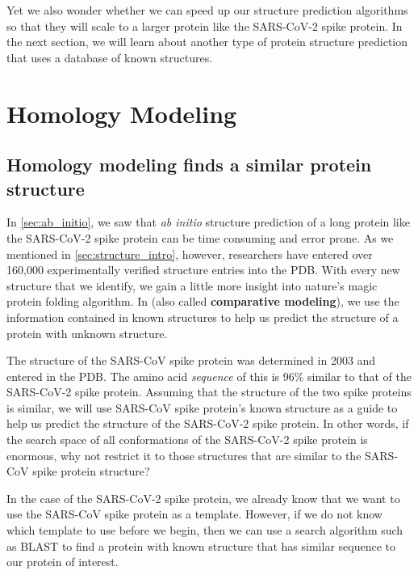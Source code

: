 Yet we also wonder whether we can speed up our structure prediction algorithms so that they will scale to a larger protein like the SARS-CoV-2 spike protein. In the next section, we will learn about another type of protein structure prediction that uses a database of known structures.\\

\begin{qbox}\end{qbox}

\FloatBarrier
{}

\section{Homology Modeling}
\label{sec:homology}
\subsection{Homology modeling finds a similar protein structure}

In \autoref{sec:ab_initio}, we saw that \textit{ab initio} structure prediction of a long protein like the SARS-CoV-2 spike protein can be time consuming and error prone. As we mentioned in \autoref{sec:structure_intro}, however, researchers have entered over 160,000 experimentally verified structure entries into the PDB. With every new structure that we identify, we gain a little more insight into nature's magic protein folding algorithm. In  (also called \textbf{comparative modeling}), we use the information contained in known structures to help us predict the structure of a protein with unknown structure.

The structure of the SARS-CoV spike protein was determined in 2003 and entered in the PDB. The amino acid \textit{sequence} of this  is 96\% similar to that of the SARS-CoV-2 spike protein. Assuming that the structure of the two spike proteins is similar, we will use SARS-CoV spike protein's known structure as a guide to help us predict the structure of the SARS-CoV-2 spike protein. In other words, if the search space of all conformations of the SARS-CoV-2 spike protein is enormous, why not restrict it to those structures that are similar to the SARS-CoV spike protein structure?

In the case of the SARS-CoV-2 spike protein, we already know that we want to use the SARS-CoV spike protein as a template. However, if we do not know which template to use before we begin, then we can use a search algorithm such as BLAST to find a protein with known structure that has similar sequence to our protein of interest.

